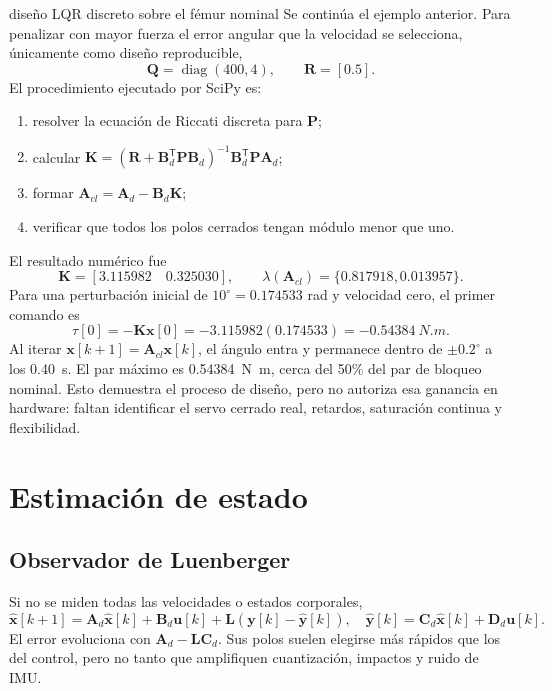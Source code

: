 \documentclass[11pt,letterpaper]{article}
\newcommand{\vect}[1]{\bm{#1}}
\newcommand{\mat}[1]{\bm{#1}}
\newcommand{\trans}{^{\mathsf T}}
\newcommand{\diag}{\operatorname{diag}}
\begin{document}
\begin{workedexample}{diseño LQR discreto sobre el fémur nominal}
Se continúa el ejemplo anterior. Para penalizar con mayor fuerza el error
angular que la velocidad se selecciona, únicamente como diseño reproducible,
\[
 \mat Q=\diag(400,4),\qquad \mat R=[0.5].
\]
El procedimiento ejecutado por SciPy es:
\begin{enumerate}
 \item resolver la ecuación de Riccati discreta para $\mat P$;
 \item calcular
 $\mat K=(\mat R+\mat B_d\trans\mat P\mat B_d)^{-1}
 \mat B_d\trans\mat P\mat A_d$;
 \item formar $\mat A_{cl}=\mat A_d-\mat B_d\mat K$;
 \item verificar que todos los polos cerrados tengan módulo menor que uno.
\end{enumerate}
El resultado numérico fue
\[
 \boxed{\mat K=[3.115982\quad0.325030]},
 \qquad\lambda(\mat A_{cl})=\boxed{\{0.817918,0.013957\}}.
\]
Para una perturbación inicial de $10^\circ=0.174533$ rad y velocidad cero, el
primer comando es
\[
 \tau[0]=-\mat K\vect x[0]
 =-3.115982(0.174533)=\SI{-0.54384}{N.m}.
\]
Al iterar $\vect x[k+1]=\mat A_{cl}\vect x[k]$, el ángulo entra y permanece
dentro de $\pm0.2^\circ$ a los \SI{0.40}{s}. El par máximo es
\SI{0.54384}{N.m}, cerca del 50\% del par de bloqueo nominal. Esto demuestra el
proceso de diseño, pero no autoriza esa ganancia en hardware: faltan identificar
el servo cerrado real, retardos, saturación continua y flexibilidad.
\end{workedexample}

\section{Estimación de estado}
\subsection{Observador de Luenberger}
Si no se miden todas las velocidades o estados corporales,
\begin{equation}
 \hat{\vect x}[k+1]=\mat A_d\hat{\vect x}[k]+\mat B_d\vect u[k]
 +\mat L(\vect y[k]-\hat{\vect y}[k]),
 \quad \hat{\vect y}[k]=\mat C_d\hat{\vect x}[k]+\mat D_d\vect u[k].
 \label{eq:observer}
\end{equation}
El error evoluciona con $\mat A_d-\mat L\mat C_d$. Sus polos suelen elegirse
más rápidos que los del control, pero no tanto que amplifiquen cuantización,
impactos y ruido de IMU.
\end{document}
